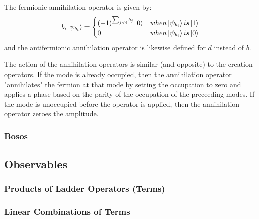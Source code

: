 The fermionic annihilation operator is given by:
\begin{equation}
    b_i \ket{\psi_{b_i}} = 
    \begin{cases} 
        (-1)^{\sum_{j < i} b_j} \ket{0}  & when \ket{\psi_{b_i}} is \ket{1} \\
        0 & when \ket{\psi_{b_i}} is \ket{0}
    \end{cases}
\end{equation}
and the antifermionic annihilation operator is likewise defined for $d$ instead of $b$.

The action of the annihilation operators is similar (and opposite) to the creation operators.
If the mode is already occupied, then the annihilation operator "annihilates" the fermion at that mode by setting the occupation to zero and applies a phase based on the parity of the occupation of the preceeding modes.
If the mode is unoccupied before the operator is applied, then the annihilation operator zeroes the amplitude.

\subsubsection{Bosos}

\subsection{Observables}
\label{subsec:observables}

\subsubsection{Products of Ladder Operators (Terms)}


\subsubsection{Linear Combinations of Terms}

